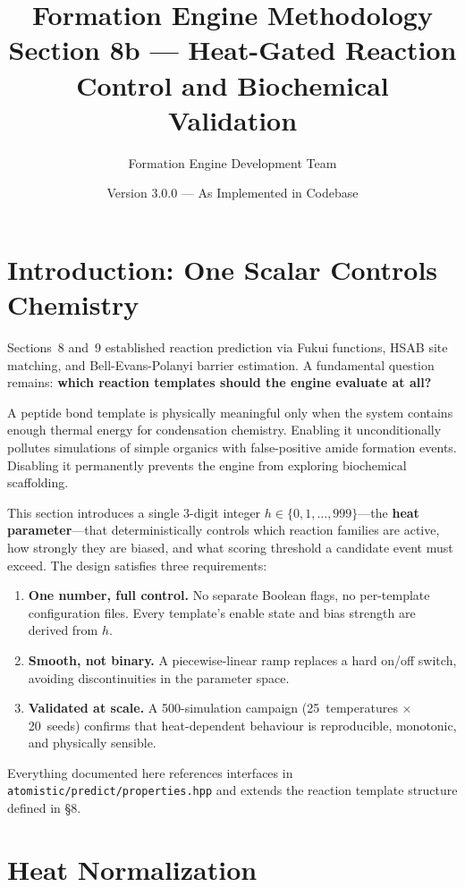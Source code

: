 \documentclass[11pt]{article}
\title{\textbf{Formation Engine Methodology} \\
\Large Section 8b — Heat-Gated Reaction Control and Biochemical Validation}
\author{Formation Engine Development Team}
\date{Version 3.0.0 — As Implemented in Codebase}
\begin{document}
\maketitle

\section{Introduction: One Scalar Controls Chemistry}

Sections~8 and~9 established reaction prediction via Fukui functions, HSAB
site matching, and Bell-Evans-Polanyi barrier estimation.  A fundamental
question remains: \textbf{which reaction templates should the engine evaluate
at all?}

A peptide bond template is physically meaningful only when the system contains
enough thermal energy for condensation chemistry.  Enabling it
unconditionally pollutes simulations of simple organics with false-positive
amide formation events.  Disabling it permanently prevents the engine from
exploring biochemical scaffolding.

This section introduces a single 3-digit integer
$h \in \{0,1,\ldots,999\}$---the \textbf{heat parameter}---that
deterministically controls which reaction families are active, how strongly
they are biased, and what scoring threshold a candidate event must exceed.
The design satisfies three requirements:

\begin{enumerate}
\item \textbf{One number, full control.}  No separate Boolean flags, no
      per-template configuration files.  Every template's enable state and
      bias strength are derived from $h$.
\item \textbf{Smooth, not binary.}  A piecewise-linear ramp replaces a hard
      on/off switch, avoiding discontinuities in the parameter space.
\item \textbf{Validated at scale.}  A 500-simulation campaign (25~temperatures
      $\times$ 20~seeds) confirms that heat-dependent behaviour is
      reproducible, monotonic, and physically sensible.
\end{enumerate}

Everything documented here references interfaces in
\texttt{atomistic/predict/properties.hpp} and extends the reaction template
structure defined in \S8.

\section{Heat Normalization}
\end{document}
